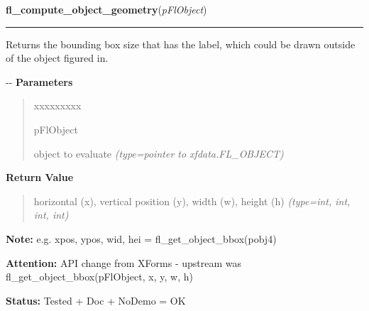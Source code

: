\hspace{.8\funcindent}\begin{boxedminipage}{\funcwidth}

    \raggedright \textbf{fl\_compute\_object\_geometry}(\textit{pFlObject})

    \vspace{-1.5ex}

    \rule{\textwidth}{0.5\fboxrule}
\setlength{\parskip}{2ex}

Returns the bounding box size that has the label, which could be drawn
outside of the object figured in.

-{}-
\setlength{\parskip}{1ex}
      \textbf{Parameters}
      \vspace{-1ex}

      \begin{quote}
        \begin{Ventry}{xxxxxxxxx}

          \item[pFlObject]


object to evaluate
            {\it (type=pointer to xfdata.FL\_OBJECT)}

        \end{Ventry}

      \end{quote}

      \textbf{Return Value}
    \vspace{-1ex}

      \begin{quote}

horizontal (x), vertical position (y), width (w), height (h)
      {\it (type=int, int, int, int)}

      \end{quote}

\textbf{Note:} 
e.g. xpos, ypos, wid, hei = fl\_get\_object\_bbox(pobj4)


\textbf{Attention:} 
API change from XForms - upstream was
fl\_get\_object\_bbox(pFlObject, x, y, w, h)


\textbf{Status:} 
Tested + Doc + NoDemo = OK


    \end{boxedminipage}

    \label{xformslib:flbasic:fl_call_object_callback}

    \vspace{0.5ex}

